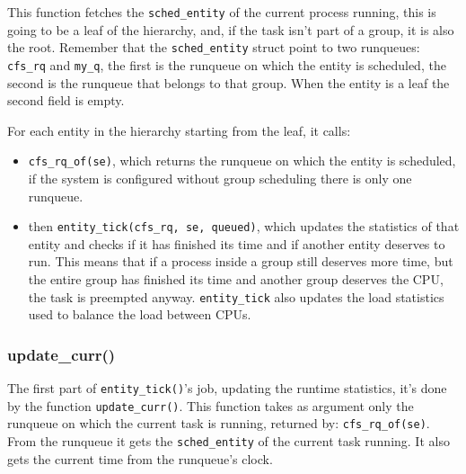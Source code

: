 This function fetches the \verb|sched_entity| of the current process running, this is going to be a leaf of the hierarchy, and, if the task isn't part of a group, it is also the root. Remember that the \verb|sched_entity| struct point to two runqueues: \verb|cfs_rq| and \verb|my_q|, the first is the runqueue on which the entity is scheduled, the second is the runqueue that belongs to that group. When the entity is a leaf the second field is empty. 

For each entity in the hierarchy starting from the leaf, it calls:
\begin{itemize}
    \item \verb|cfs_rq_of(se)|, which returns the runqueue on which the entity is scheduled, if the system is configured without group scheduling there is only one runqueue.
    
    \item then \verb|entity_tick(cfs_rq, se, queued)|, which updates the statistics of that entity and checks if it has finished its time and if another entity deserves to run. This means that if a process inside a group still deserves more time, but the entire group has finished its time and another group deserves the CPU, the task is preempted anyway. \verb|entity_tick| also updates the load statistics used to balance the load between CPUs.
\end{itemize}

\subsubsection{update\_curr()}

The first part of \verb|entity_tick()|'s job, updating the runtime statistics, it's done by the function \verb|update_curr()|. This function takes as argument only the runqueue on which the current task is running, returned by: \verb|cfs_rq_of(se)|. From the runqueue it gets the \verb|sched_entity| of the current task running. It also gets the current time from the runqueue's clock.

